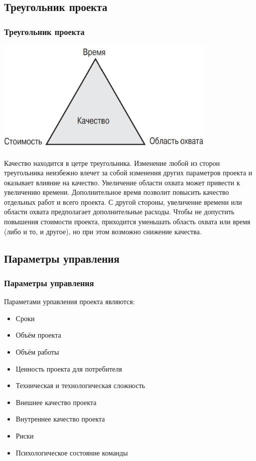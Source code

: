 \documentclass{../industrial-development}
\begin{document}
\subsection{Треугольник проекта}

\begin{frame} \frametitle{Треугольник проекта}
	\centerline{\includegraphics[width=0.8\textwidth]{trinagle.pdf}}
\end{frame}
\lecturenotes
Качество находится в цетре треугольника. Изменение любой из сторон треугольника неизбежно влечет за собой изменения других параметров проекта и оказывает влияние на качество. Увеличение области охвата может привести к увеличению времени. Дополнительное время позволит повысить качество отдельных работ и всего проекта. С другой стороны, увеличение времени или области охвата предполагает дополнительные расходы. Чтобы не допустить повышения стоимости проекта, приходится уменьшать область охвата или время (либо и то, и другое), но при этом возможно снижение качества.

\subsection{Параметры управления}

\begin{frame} \frametitle{Параметры управления}
	Параметами урпавления проекта являются:
	\begin{itemize}
	\item Сроки
	\item Объём проекта
	\item Объём работы
	\item Ценность проекта для потребителя
	\item Техническая и технологическая сложность
	\item Внешнее качество проекта
	\item Внутреннее качество проекта
	\item Риски
	\item Психологическое состояние команды
	\end{itemize}
\end{frame}
\end{document}
